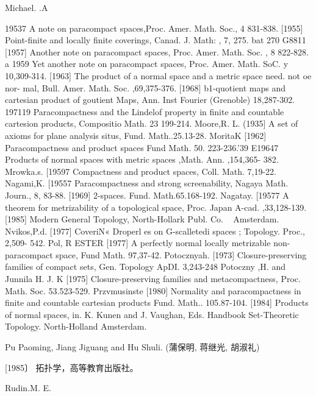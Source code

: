 \documentclass[main.tex]{subfiles}
\begin{document}
\noindent Michael. .A
{19537
	A note on paracompact spaces,Proc. Amer. Math. Soc., 4 831-838.
	[1955]
	Point-finite and locally finite coverings, Canad. J. Math: , 7, 275.
	bat 270
	G8811
	[1957]
	Another note on paracompact spaces, Proc. Amer. Math. Soc. , 8
	822-828.
	a 1959 Yet another note on paracompact spaces, Proc. Amer. Math.
	SoC. y
	10,309-314.
	[1963]
	The product of a normal space and a metric space
	need. not oe nor-
	mal, Bull. Amer. Math. Soc. ,69,375-376.
	[1968]
	b1-quotient maps and cartesian product of goutient Maps, Ann. Inst
	Fourier (Grenoble) 18,287-302.
	197119 Paracompactness and the Lindelof property in finite and countable
	cartesion products, Compositio Math. 23 199-214.
	Moore,R. L.
	(1935]
	A set of axioms for plane analysis situs, Fund. Math..25.13-28.
	MoritaK
	[1962]
	Paracompactness and product spaces Fund Math. 50. 223-236.'39
	E19647 Products of normal spaces with metric spaces ,Math. Ann. ,154,365-
	382.
	Mrowka.s.
	[19597 Compactness and product spaces, Coll. Math. 7,19-22.
	Nagami,K.
	[19557 Paracompactness and strong screenability, Nagaya Math. Journ., 8,
	83-88.
	[1969]
	2-spaces. Fund. Math.65.168-192.
	Nagatay.
	[19577 A theorem for metrizability of a topological space, Proc. Japan A-cad. ,33,128-139.
	[1985]
	Modern General Topology, North-Hollark Publ. Co.
	~ Amsterdam.
	Nvikos,P.d.
	[1977]
	CoveriN« Droperl
	es on G-scalletedi spaces ; Topology. Proc., 2,509-
	542.
	Pol, R
	ESTER
	[1977] A perfectly normal locally metrizable non-paracompact space, Fund
	Math.
	97,37-42.
	Potocznyah.
	[1973]
	Closure-preserving families of compact sets, Gen. Topology ApDI.
	3,243-248
	Potoczny ,H. and Junnila H. J. K
	[1975]%
	Closure-preserving
	families and metacompactness, Proc.
	Math. Soc.
	53.523-529.
	Przvmusinste
	[1980]
	Normality and paracompactness in finite and countable cartesian
	products Fund. Math.. 105.87-104.
	[1984]
	Products of normal spaces, in. K. Kunen and J. Vaughan, Eds.
	Handbook
	Set-Theoretic
	Topology.
	North-Holland
	Amsterdam.

\noindent Pu Paoming, Jiang Jiguang and Hu Shuli. (蒲保明, 蒋继光, 胡淑礼)
	
	[1985〕 拓扑学，高等教育出版社。

\noindent Rudin.M. E.

}
\end{document}

